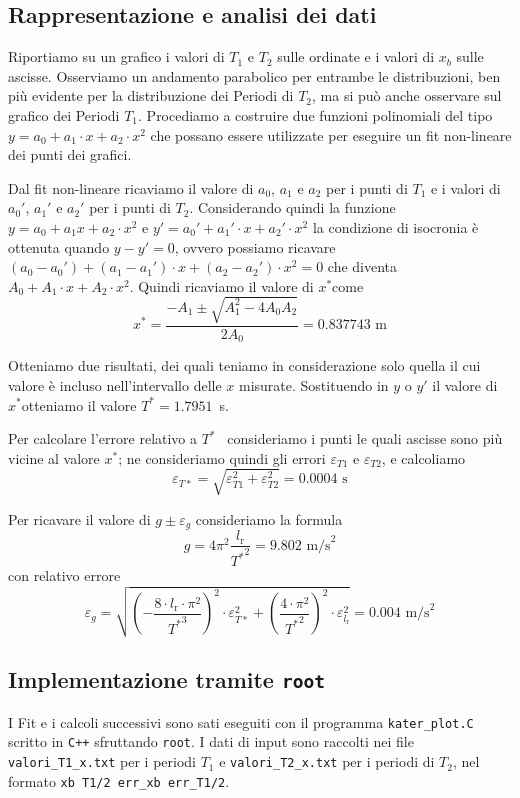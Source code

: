 \documentclass[italian, a4paper, 10pt, twocolumn]{../../style/lab_unige}
\newcommand{\stdErr}[1]{$\varepsilon_{#1}$}
\newcommand{\mstdErr}[1]{\varepsilon_{#1}}
\newcommand{\cernroot}{\texttt{root}}
\newcommand{\Tiso}{$T^*$}
\newcommand{\xiso}{$x^*$}
\begin{document}
    \subsection{Rappresentazione e analisi dei dati}
    Riportiamo su un grafico i valori di $T_1$ e $T_2$ sulle ordinate e i valori di $x_b$ sulle ascisse. Osserviamo un andamento parabolico per entrambe le distribuzioni, ben più evidente per la distribuzione dei Periodi di $T_2$, ma si può anche osservare sul grafico dei Periodi $T_1$. 
    Procediamo a costruire due funzioni polinomiali del tipo $y=a_0+a_1\cdot x+a_2\cdot x^2$ che possano essere utilizzate per eseguire un fit non-lineare dei punti dei grafici.

    Dal fit non-lineare ricaviamo il valore di $a_0$, $a_1$ e $a_2$ per i punti di $T_1$ e i valori di $a_0'$, $a_1'$ e $a_2'$ per i punti di $T_2$.
    Considerando quindi la funzione $y=a_0+a_1x+a_2\cdot x^2$ e $y'=a_0'+a_1'\cdot x+a_2'\cdot x^2$ la condizione di isocronia è ottenuta quando $y-y'=0$, ovvero possiamo ricavare $(a_0-a_0')+(a_1-a_1')\cdot x+(a_2-a_2')\cdot x^2=0$ che diventa $A_0+A_1\cdot x + A_2 \cdot x^2$. Quindi ricaviamo il valore di \xiso come
    \begin{equation}\label{eqn:xiso}
        x^* = \frac{-A_1\pm\sqrt{A_1^2-4 A_0 A_2}}{2A_0}=0.837743\text{ m}
    \end{equation}

    Otteniamo due risultati, dei quali teniamo in considerazione solo quella il cui valore è incluso nell'intervallo delle $x$ misurate.
    Sostituendo in $y$ o $y'$ il valore di \xiso otteniamo il valore \Tiso$=1.7951$~s.

    Per calcolare l'errore relativo a \Tiso~ consideriamo i punti le quali ascisse sono più vicine al valore \xiso; ne consideriamo quindi gli errori \stdErr{T1} e \stdErr{T2}, e calcoliamo \[\mstdErr{T*}=\sqrt{\mstdErr{T1}^2+\mstdErr{T2}^2}=0.0004\text{ s}\]

    Per ricavare il valore di $g\pm\mstdErr{g}$ consideriamo la formula
    \[
        g=4\pi^2\frac{l_{\text{r}}}{{T^*}^2}=9.802\text{ m/s}^2
    \]
    con relativo errore
    \[
        \mstdErr{g}=\sqrt{
            \left(
                -\frac{8\cdot l_{\text{r}}\cdot\pi^2}{{T^*}^3}
            \right)^2\cdot\mstdErr{T*}^2+
            \left(
                \frac{4\cdot\pi^2}{{T^*}^2}
            \right)^2\cdot\mstdErr{l_{\text{r}}}^2
        }=0.004\text{ m/s}^2
    \]

    \subsection{Implementazione tramite {\normalfont \cernroot}}
    I Fit e i calcoli successivi sono sati eseguiti con il programma \verb|kater_plot.C| scritto in \verb|C++| sfruttando \cernroot. I dati di input sono raccolti nei file \verb|valori_T1_x.txt| per i periodi $T_1$ e \verb|valori_T2_x.txt| per i periodi di $T_2$, nel formato \verb|xb T1/2 err_xb err_T1/2|.
\end{document}
